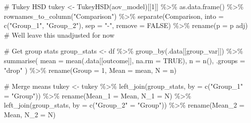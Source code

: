 \documentclass[
  letterpaper,
  DIV=11,
  numbers=noendperiod]{scrartcl}
\newenvironment{Shaded}{\begin{snugshade}}{\end{snugshade}}
\newcommand{\AttributeTok}[1]{\textcolor[rgb]{0.40,0.45,0.13}{#1}}
\newcommand{\CommentTok}[1]{\textcolor[rgb]{0.37,0.37,0.37}{#1}}
\newcommand{\ConstantTok}[1]{\textcolor[rgb]{0.56,0.35,0.01}{#1}}
\newcommand{\DecValTok}[1]{\textcolor[rgb]{0.68,0.00,0.00}{#1}}
\newcommand{\FunctionTok}[1]{\textcolor[rgb]{0.28,0.35,0.67}{#1}}
\newcommand{\NormalTok}[1]{\textcolor[rgb]{0.00,0.23,0.31}{#1}}
\newcommand{\OtherTok}[1]{\textcolor[rgb]{0.00,0.23,0.31}{#1}}
\newcommand{\SpecialCharTok}[1]{\textcolor[rgb]{0.37,0.37,0.37}{#1}}
\newcommand{\StringTok}[1]{\textcolor[rgb]{0.13,0.47,0.30}{#1}}
\begin{document}
\begin{Shaded}
\begin{Highlighting}[]
  \CommentTok{\# Tukey HSD}
\NormalTok{  tukey }\OtherTok{\textless{}{-}} \FunctionTok{TukeyHSD}\NormalTok{(aov\_model)[[}\DecValTok{1}\NormalTok{]] }\SpecialCharTok{\%\textgreater{}\%}
    \FunctionTok{as.data.frame}\NormalTok{() }\SpecialCharTok{\%\textgreater{}\%}
    \FunctionTok{rownames\_to\_column}\NormalTok{(}\StringTok{"Comparison"}\NormalTok{) }\SpecialCharTok{\%\textgreater{}\%}
    \FunctionTok{separate}\NormalTok{(Comparison, }\AttributeTok{into =} \FunctionTok{c}\NormalTok{(}\StringTok{"Group\_1"}\NormalTok{, }\StringTok{"Group\_2"}\NormalTok{), }\AttributeTok{sep =} \StringTok{"{-}"}\NormalTok{, }\AttributeTok{remove =} \ConstantTok{FALSE}\NormalTok{) }\SpecialCharTok{\%\textgreater{}\%}
    \FunctionTok{rename}\NormalTok{(}\AttributeTok{p =} \StringTok{\textasciigrave{}}\AttributeTok{p adj}\StringTok{\textasciigrave{}}\NormalTok{)  }\CommentTok{\# We\textquotesingle{}ll leave this unadjusted for now}
  
  \CommentTok{\# Get group stats}
\NormalTok{  group\_stats }\OtherTok{\textless{}{-}}\NormalTok{ df }\SpecialCharTok{\%\textgreater{}\%}
    \FunctionTok{group\_by}\NormalTok{(.data[[group\_var]]) }\SpecialCharTok{\%\textgreater{}\%}
    \FunctionTok{summarise}\NormalTok{(}
      \AttributeTok{mean =} \FunctionTok{mean}\NormalTok{(.data[[outcome]], }\AttributeTok{na.rm =} \ConstantTok{TRUE}\NormalTok{),}
      \AttributeTok{n =} \FunctionTok{n}\NormalTok{(),}
      \AttributeTok{.groups =} \StringTok{"drop"}
\NormalTok{    ) }\SpecialCharTok{\%\textgreater{}\%}
    \FunctionTok{rename}\NormalTok{(}\AttributeTok{Group =} \DecValTok{1}\NormalTok{, }\AttributeTok{Mean =}\NormalTok{ mean, }\AttributeTok{N =}\NormalTok{ n)}
  
  \CommentTok{\# Merge means}
\NormalTok{  tukey }\OtherTok{\textless{}{-}}\NormalTok{ tukey }\SpecialCharTok{\%\textgreater{}\%}
    \FunctionTok{left\_join}\NormalTok{(group\_stats, }\AttributeTok{by =} \FunctionTok{c}\NormalTok{(}\StringTok{"Group\_1"} \OtherTok{=} \StringTok{"Group"}\NormalTok{)) }\SpecialCharTok{\%\textgreater{}\%}
    \FunctionTok{rename}\NormalTok{(}\AttributeTok{Mean\_1 =}\NormalTok{ Mean, }\AttributeTok{N\_1 =}\NormalTok{ N) }\SpecialCharTok{\%\textgreater{}\%}
    \FunctionTok{left\_join}\NormalTok{(group\_stats, }\AttributeTok{by =} \FunctionTok{c}\NormalTok{(}\StringTok{"Group\_2"} \OtherTok{=} \StringTok{"Group"}\NormalTok{)) }\SpecialCharTok{\%\textgreater{}\%}
    \FunctionTok{rename}\NormalTok{(}\AttributeTok{Mean\_2 =}\NormalTok{ Mean, }\AttributeTok{N\_2 =}\NormalTok{ N)}
  

\end{Highlighting}
\end{Shaded}
\end{document}
